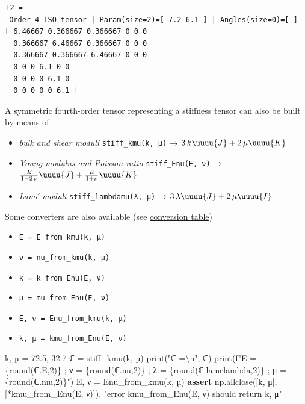 \documentclass[
  letterpaper,
  DIV=11,
  numbers=noendperiod]{scrreprt}
\newenvironment{Shaded}{\begin{snugshade}}{\end{snugshade}}
\newcommand{\BuiltInTok}[1]{\textcolor[rgb]{0.00,0.23,0.31}{#1}}
\newcommand{\CharTok}[1]{\textcolor[rgb]{0.13,0.47,0.30}{#1}}
\newcommand{\ControlFlowTok}[1]{\textcolor[rgb]{0.00,0.23,0.31}{\textbf{#1}}}
\newcommand{\DecValTok}[1]{\textcolor[rgb]{0.68,0.00,0.00}{#1}}
\newcommand{\FloatTok}[1]{\textcolor[rgb]{0.68,0.00,0.00}{#1}}
\newcommand{\NormalTok}[1]{\textcolor[rgb]{0.00,0.23,0.31}{#1}}
\newcommand{\OperatorTok}[1]{\textcolor[rgb]{0.37,0.37,0.37}{#1}}
\newcommand{\SpecialCharTok}[1]{\textcolor[rgb]{0.37,0.37,0.37}{#1}}
\newcommand{\SpecialStringTok}[1]{\textcolor[rgb]{0.13,0.47,0.30}{#1}}
\newcommand{\StringTok}[1]{\textcolor[rgb]{0.13,0.47,0.30}{#1}}
\providecommand{\tightlist}{%
  \setlength{\itemsep}{0pt}\setlength{\parskip}{0pt}}\usepackage{longtable,booktabs,array}
\begin{document}
\begin{verbatim}
𝕋2 =
 Order 4 ISO tensor | Param(size=2)=[ 7.2 6.1 ] | Angles(size=0)=[ ]
[ 6.46667 0.366667 0.366667 0 0 0 
  0.366667 6.46667 0.366667 0 0 0 
  0.366667 0.366667 6.46667 0 0 0 
  0 0 0 6.1 0 0 
  0 0 0 0 6.1 0 
  0 0 0 0 0 6.1 ]
\end{verbatim}

A symmetric fourth-order tensor representing a stiffness tensor can also
be built by means of

\begin{itemize}
\tightlist
\item
  \emph{bulk and shear moduli} \texttt{stiff\_kmu(k,\ µ)} →
  \(3\,k \uuuu{J} + 2\,\mu \uuuu{K}\)
\item
  \emph{Young modulus and Poisson ratio} \texttt{stiff\_Enu(E,\ ν)} →
  \(\frac{E}{1-2\,\nu} \uuuu{J} + \frac{E}{1+\nu} \uuuu{K}\)
\item
  \emph{Lamé moduli} \texttt{stiff\_lambdamu(λ,\ μ)} →
  \(3\,\lambda \uuuu{J} + 2\,\mu \uuuu{I}\)
\end{itemize}

Some converters are also available (see
\href{https://en.wikipedia.org/wiki/Lam\%C3\%A9_parameters}{conversion
table})

\begin{itemize}
\tightlist
\item
  \texttt{E\ =\ E\_from\_kmu(k,\ µ)}
\item
  \texttt{ν\ =\ nu\_from\_kmu(k,\ µ)}
\item
  \texttt{k\ =\ k\_from\_Enu(E,\ ν)}
\item
  \texttt{µ\ =\ mu\_from\_Enu(E,\ ν)}
\item
  \texttt{E,\ ν\ =\ Enu\_from\_kmu(k,\ µ)}
\item
  \texttt{k,\ µ\ =\ kmu\_from\_Enu(E,\ ν)}
\end{itemize}

\begin{Shaded}
\begin{Highlighting}[]
\NormalTok{k, µ }\OperatorTok{=} \FloatTok{72.5}\NormalTok{, }\FloatTok{32.7}
\NormalTok{ℂ }\OperatorTok{=}\NormalTok{ stiff\_kmu(k, µ)}
\BuiltInTok{print}\NormalTok{(}\StringTok{"ℂ =}\CharTok{\textbackslash{}n}\StringTok{"}\NormalTok{, ℂ)}
\BuiltInTok{print}\NormalTok{(}\SpecialStringTok{f"E = }\SpecialCharTok{\{}\BuiltInTok{round}\NormalTok{(ℂ.E,}\DecValTok{2}\NormalTok{)}\SpecialCharTok{\}}\SpecialStringTok{ ; ν = }\SpecialCharTok{\{}\BuiltInTok{round}\NormalTok{(ℂ.nu,}\DecValTok{2}\NormalTok{)}\SpecialCharTok{\}}\SpecialStringTok{ ; λ = }\SpecialCharTok{\{}\BuiltInTok{round}\NormalTok{(ℂ.lamelambda,}\DecValTok{2}\NormalTok{)}\SpecialCharTok{\}}\SpecialStringTok{ ; μ = }\SpecialCharTok{\{}\BuiltInTok{round}\NormalTok{(ℂ.mu,}\DecValTok{2}\NormalTok{)}\SpecialCharTok{\}}\SpecialStringTok{"}\NormalTok{)}
\NormalTok{E, ν }\OperatorTok{=}\NormalTok{ Enu\_from\_kmu(k, µ)}
\ControlFlowTok{assert}\NormalTok{ np.allclose([k, μ], [}\OperatorTok{*}\NormalTok{kmu\_from\_Enu(E, ν)]), }\StringTok{"error kmu\_from\_Enu(E, ν) should return k, μ"}
\end{Highlighting}
\end{Shaded}
\end{document}
